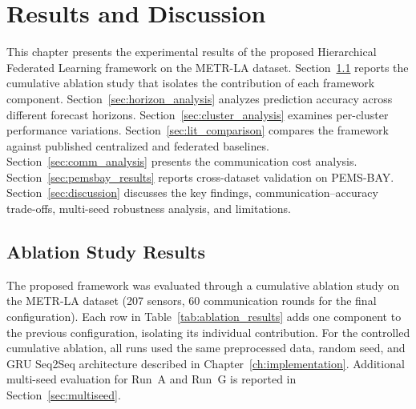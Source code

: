 \chapter{Results and Discussion}
\label{ch:results}
This chapter presents the experimental results of the proposed Hierarchical Federated Learning framework on the METR-LA dataset. Section~\ref{sec:ablation_results} reports the cumulative ablation study that isolates the contribution of each framework component. Section~\ref{sec:horizon_analysis} analyzes prediction accuracy across different forecast horizons. Section~\ref{sec:cluster_analysis} examines per-cluster performance variations. Section~\ref{sec:lit_comparison} compares the framework against published centralized and federated baselines. Section~\ref{sec:comm_analysis} presents the communication cost analysis. Section~\ref{sec:pemsbay_results} reports cross-dataset validation on PEMS-BAY. Section~\ref{sec:discussion} discusses the key findings, communication--accuracy trade-offs, multi-seed robustness analysis, and limitations.
\section{Ablation Study Results}
\label{sec:ablation_results}
The proposed framework was evaluated through a cumulative ablation study on the METR-LA dataset (207 sensors, 60 communication rounds for the final configuration). Each row in Table~\ref{tab:ablation_results} adds one component to the previous configuration, isolating its individual contribution. For the controlled cumulative ablation, all runs used the same preprocessed data, random seed, and GRU Seq2Seq architecture described in Chapter~\ref{ch:implementation}. Additional multi-seed evaluation for Run~A and Run~G is reported in Section~\ref{sec:multiseed}.

